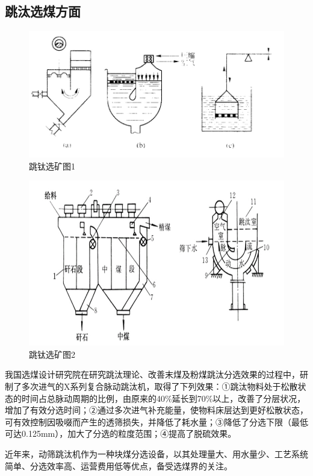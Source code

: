 \documentclass[10pt,openany]{ctexbook}
\begin{document}
 \subsection{跳汰选煤方面}
   \begin{figure}[!ht]
\includegraphics[scale=0.6]{19}
\caption{跳钛选矿图1}
\end{figure}
   \begin{figure}[!ht]
\includegraphics[scale=0.6]{20}
\caption{跳钛选矿图2}
\end{figure}
我国选煤设计研究院在研究跳汰理论、改善末煤及粉煤跳汰分选效果的过程中，研制了多次进气的X系列复合脉动跳汰机，取得了下列效果：①跳汰物料处于松散状态的时间占总脉动周期的比例，由原来的40\%延长到70\%以上，改善了分层状况，增加了有效分选时间；②通过多次进气补充能量，使物料床层达到更好松散状态，可有效控制因吸啜而产生的透筛损失，并降低了耗水量；③降低了分选下限（最低可达0.125mm），加大了分选的粒度范围；④提高了脱硫效果。\par
近年来，动筛跳汰机作为一种块煤分选设备，以其处理量大、用水量少、工艺系统简单、分选效率高、运营费用低等优点，备受选煤界的关注。
\end{document}
